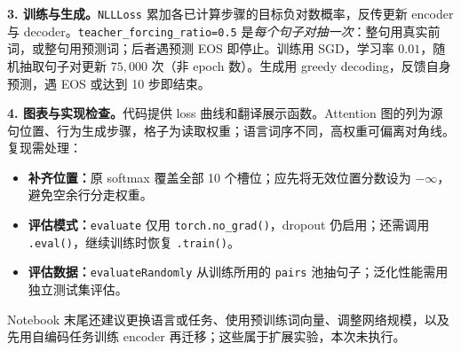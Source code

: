 \textbf{3. 训练与生成。}\texttt{NLLLoss} 累加各已计算步骤的目标负对数概率，反传更新 encoder 与 decoder。\texttt{teacher\_forcing\_ratio=0.5} 是\emph{每个句子对抽一次}：整句用真实前词，或整句用预测词；后者遇预测 EOS 即停止。训练用 SGD，学习率 $0.01$，随机抽取句子对更新 $75{,}000$ 次（非 epoch 数）。生成用 greedy decoding，反馈自身预测，遇 EOS 或达到 10 步即结束。

\textbf{4. 图表与实现检查。}代码提供 loss 曲线和翻译展示函数。Attention 图的列为源句位置、行为生成步骤，格子为读取权重；语言词序不同，高权重可偏离对角线。复现需处理：
\begin{itemize}
 \item \textbf{补齐位置：}原 softmax 覆盖全部 10 个槽位；应先将无效位置分数设为 $-\infty$，避免空余行分走权重。
 \item \textbf{评估模式：}\texttt{evaluate} 仅用 \texttt{torch.no\_grad()}，dropout 仍启用；还需调用 \texttt{.eval()}，继续训练时恢复 \texttt{.train()}。
 \item \textbf{评估数据：}\texttt{evaluateRandomly} 从训练所用的 \texttt{pairs} 池抽句子；泛化性能需用独立测试集评估。
\end{itemize}
Notebook 末尾还建议更换语言或任务、使用预训练词向量、调整网络规模，以及先用自编码任务训练 encoder 再迁移；这些属于扩展实验，本次未执行。

\endgroup
